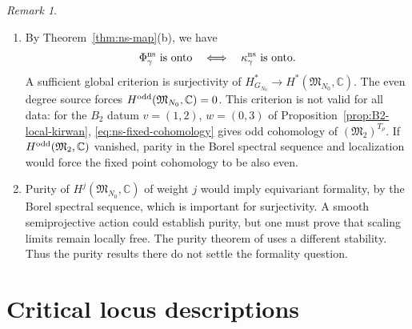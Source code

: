 \documentclass[11pt,reqno]{amsart}
\theoremstyle{definition}
\theoremstyle{remark}
\newtheorem{Remark}[Theorem]{Remark}
\def\bbC{\mathbb C}
\begin{document}
\begin{Remark}\hfill
\begin{enumerate}[label=$\mathrm{(\alph*)}$,leftmargin=8mm,itemsep=2mm]
\item 
By Theorem~\ref{thm:ns-map}(b), we have
\begin{equation*}
 \Phi^{\rm ns}_\gamma\text{ is onto}
 \quad\Longleftrightarrow\quad
 \kappa^{\rm ns}_\gamma\text{ is onto}.
\end{equation*}
A sufficient global criterion is surjectivity of
$H^*_{G_{N_0}}\to H^*(\mathfrak M_{N_0},\bbC)$.
The even degree source forces $H^{\rm odd}(\mathfrak M_{N_0},\mathbb C)=0$.
This criterion is not valid for all data:
for the $B_2$ datum $v=(1,2)$, $w=(0,3)$ of
Proposition~\ref{prop:B2-local-kirwan},
\eqref{eq:ns-fixed-cohomology} gives odd cohomology of
$(\mathfrak M_2)^{T_\rho}$. If $H^{\rm odd}(\mathfrak M_2,\mathbb C)$ vanished,
parity in the Borel spectral sequence and localization
would force the fixed point cohomology to be also even. 

\item
Purity of $H^j(\mathfrak M_{N_0},\mathbb C)$ of weight $j$ would imply equivariant
formality, by the Borel spectral sequence, which is important for surjectivity. A smooth
semiprojective action could establish purity, but one must prove
that scaling limits remain locally free. The purity theorem of
\cite[Thm.~B, \S5.4]{HJV25} uses a different stability.
Thus the purity results there do not settle the formality question.
\end{enumerate}
\end{Remark}






\section{Critical locus descriptions}\label{app:ns-critical}
\end{document}
